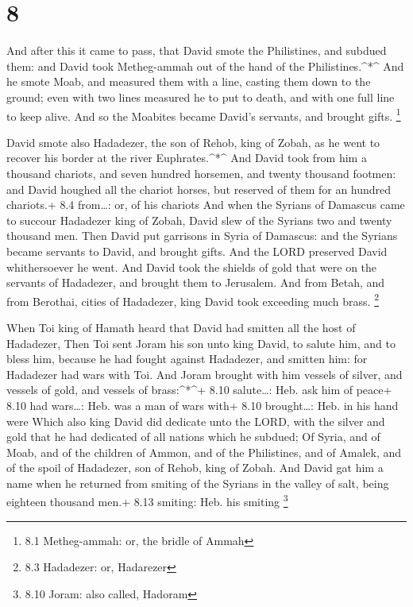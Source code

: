 \hypertarget{section-7}{%
\section{8}\label{section-7}}

 And after this it came to pass, that David smote the
Philistines, and subdued them: and David took Metheg-ammah out of the
hand of the Philistines.\^{}*\^{}  And he smote Moab, and
measured them with a line, casting them down to the ground; even with
two lines measured he to put to death, and with one full line to keep
alive. And so the Moabites became David's servants, and brought gifts.
\footnote{8.1 Metheg-ammah: or, the bridle of Ammah}

 David smote also Hadadezer, the son of Rehob, king of
Zobah, as he went to recover his border at the river Euphrates.\^{}*\^{}
 And David took from him a thousand chariots, and seven
hundred horsemen, and twenty thousand footmen: and David houghed all the
chariot horses, but reserved of them for an hundred chariots.+ 8.4
from\ldots: or, of his chariots  And when the Syrians of
Damascus came to succour Hadadezer king of Zobah, David slew of the
Syrians two and twenty thousand men.  Then David put
garrisons in Syria of Damascus: and the Syrians became servants to
David, and brought gifts. And the LORD preserved David whithersoever he
went.  And David took the shields of gold that were on the
servants of Hadadezer, and brought them to Jerusalem.  And
from Betah, and from Berothai, cities of Hadadezer, king David took
exceeding much brass. \footnote{8.3 Hadadezer: or, Hadarezer}

 When Toi king of Hamath heard that David had smitten all
the host of Hadadezer,  Then Toi sent Joram his son unto
king David, to salute him, and to bless him, because he had fought
against Hadadezer, and smitten him: for Hadadezer had wars with Toi. And
Joram brought with him vessels of silver, and vessels of gold, and
vessels of brass:\^{}*\^{}+ 8.10 salute\ldots: Heb. ask him of peace+
8.10 had wars\ldots: Heb. was a man of wars with+ 8.10 brought\ldots:
Heb. in his hand were  Which also king David did dedicate
unto the LORD, with the silver and gold that he had dedicated of all
nations which he subdued;  Of Syria, and of Moab, and of
the children of Ammon, and of the Philistines, and of Amalek, and of the
spoil of Hadadezer, son of Rehob, king of Zobah.  And David
gat him a name when he returned from smiting of the Syrians in the
valley of salt, being eighteen thousand men.+ 8.13 smiting: Heb. his
smiting \footnote{8.10 Joram: also called, Hadoram}

